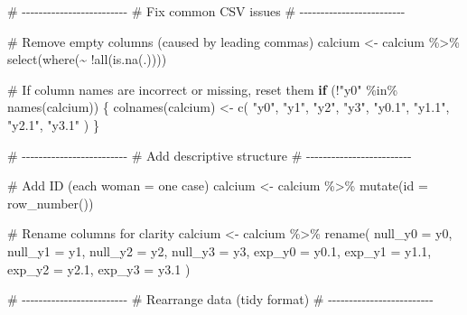 \documentclass[
  letterpaper,
  DIV=11,
  numbers=noendperiod]{scrartcl}
\newenvironment{Shaded}{\begin{snugshade}}{\end{snugshade}}
\newcommand{\AttributeTok}[1]{\textcolor[rgb]{0.40,0.45,0.13}{#1}}
\newcommand{\CommentTok}[1]{\textcolor[rgb]{0.37,0.37,0.37}{#1}}
\newcommand{\ControlFlowTok}[1]{\textcolor[rgb]{0.00,0.23,0.31}{\textbf{#1}}}
\newcommand{\FloatTok}[1]{\textcolor[rgb]{0.68,0.00,0.00}{#1}}
\newcommand{\FunctionTok}[1]{\textcolor[rgb]{0.28,0.35,0.67}{#1}}
\newcommand{\NormalTok}[1]{\textcolor[rgb]{0.00,0.23,0.31}{#1}}
\newcommand{\OtherTok}[1]{\textcolor[rgb]{0.00,0.23,0.31}{#1}}
\newcommand{\SpecialCharTok}[1]{\textcolor[rgb]{0.37,0.37,0.37}{#1}}
\newcommand{\StringTok}[1]{\textcolor[rgb]{0.13,0.47,0.30}{#1}}
\begin{document}
\begin{Shaded}
\begin{Highlighting}[]
\CommentTok{\# {-}{-}{-}{-}{-}{-}{-}{-}{-}{-}{-}{-}{-}{-}{-}{-}{-}{-}{-}{-}{-}{-}{-}{-}{-}}
\CommentTok{\# Fix common CSV issues}
\CommentTok{\# {-}{-}{-}{-}{-}{-}{-}{-}{-}{-}{-}{-}{-}{-}{-}{-}{-}{-}{-}{-}{-}{-}{-}{-}{-}}

\CommentTok{\# Remove empty columns (caused by leading commas)}
\NormalTok{calcium }\OtherTok{\textless{}{-}}\NormalTok{ calcium }\SpecialCharTok{\%\textgreater{}\%}
  \FunctionTok{select}\NormalTok{(}\FunctionTok{where}\NormalTok{(}\SpecialCharTok{\textasciitilde{}} \SpecialCharTok{!}\FunctionTok{all}\NormalTok{(}\FunctionTok{is.na}\NormalTok{(.))))}

\CommentTok{\# If column names are incorrect or missing, reset them}
\ControlFlowTok{if}\NormalTok{ (}\SpecialCharTok{!}\StringTok{"y0"} \SpecialCharTok{\%in\%} \FunctionTok{names}\NormalTok{(calcium)) \{}
  \FunctionTok{colnames}\NormalTok{(calcium) }\OtherTok{\textless{}{-}} \FunctionTok{c}\NormalTok{(}
    \StringTok{"y0"}\NormalTok{, }\StringTok{"y1"}\NormalTok{, }\StringTok{"y2"}\NormalTok{, }\StringTok{"y3"}\NormalTok{,}
    \StringTok{"y0.1"}\NormalTok{, }\StringTok{"y1.1"}\NormalTok{, }\StringTok{"y2.1"}\NormalTok{, }\StringTok{"y3.1"}
\NormalTok{  )}
\NormalTok{\}}

\CommentTok{\# {-}{-}{-}{-}{-}{-}{-}{-}{-}{-}{-}{-}{-}{-}{-}{-}{-}{-}{-}{-}{-}{-}{-}{-}{-}}
\CommentTok{\# Add descriptive structure}
\CommentTok{\# {-}{-}{-}{-}{-}{-}{-}{-}{-}{-}{-}{-}{-}{-}{-}{-}{-}{-}{-}{-}{-}{-}{-}{-}{-}}

\CommentTok{\# Add ID (each woman = one case)}
\NormalTok{calcium }\OtherTok{\textless{}{-}}\NormalTok{ calcium }\SpecialCharTok{\%\textgreater{}\%}
  \FunctionTok{mutate}\NormalTok{(}\AttributeTok{id =} \FunctionTok{row\_number}\NormalTok{())}

\CommentTok{\# Rename columns for clarity}
\NormalTok{calcium }\OtherTok{\textless{}{-}}\NormalTok{ calcium }\SpecialCharTok{\%\textgreater{}\%}
  \FunctionTok{rename}\NormalTok{(}
    \AttributeTok{null\_y0 =}\NormalTok{ y0,}
    \AttributeTok{null\_y1 =}\NormalTok{ y1,}
    \AttributeTok{null\_y2 =}\NormalTok{ y2,}
    \AttributeTok{null\_y3 =}\NormalTok{ y3,}
    \AttributeTok{exp\_y0  =}\NormalTok{ y0}\FloatTok{.1}\NormalTok{,}
    \AttributeTok{exp\_y1  =}\NormalTok{ y1}\FloatTok{.1}\NormalTok{,}
    \AttributeTok{exp\_y2  =}\NormalTok{ y2}\FloatTok{.1}\NormalTok{,}
    \AttributeTok{exp\_y3  =}\NormalTok{ y3}\FloatTok{.1}
\NormalTok{  )}

\CommentTok{\# {-}{-}{-}{-}{-}{-}{-}{-}{-}{-}{-}{-}{-}{-}{-}{-}{-}{-}{-}{-}{-}{-}{-}{-}{-}}
\CommentTok{\# Rearrange data (tidy format)}
\CommentTok{\# {-}{-}{-}{-}{-}{-}{-}{-}{-}{-}{-}{-}{-}{-}{-}{-}{-}{-}{-}{-}{-}{-}{-}{-}{-}}


\end{Highlighting}
\end{Shaded}
\end{document}
